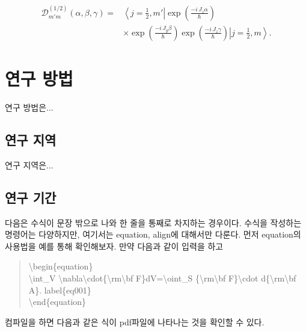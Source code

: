 \documentclass{gshs-report-v1.2}
\begin{document}
\begin{equation}
	\begin{split}
		\mathcal{D}_{m'm}^{(1/2)} (\alpha,\beta,\gamma)=&\left\langle j=\frac{1}{2},m'\right|\exp\left(\frac{-i\,J_z \alpha}{\hbar}\right)\\
		&\times\exp\left(\frac{-i\,J_y \beta}{\hbar}\right)\exp\left(\frac{-i\,J_z \gamma}{\hbar}\right)\left| j=\frac{1}{2},m\right\rangle.
	\end{split}
	\label{eq004}
\end{equation}


\section{연구 방법}
연구 방법은...

\subsection{연구 지역}
연구 지역은...

\subsection{연구 기간}

다음은 수식이 문장 밖으로 나와 한 줄을 통째로 차지하는 경우이다. 수식을 작성하는 명령어는 다양하지만, 여기서는 equation, align에 대해서만 다룬다. 먼저 equation의 사용법을 예를 통해 확인해보자. 만약 다음과 같이 입력을 하고
\begin{quote}
	{\textbackslash}begin\{equation\}\\
	{\textbackslash}int\_V 
	{\textbackslash}nabla{\textbackslash}cdot\{{\textbackslash}rm{\textbackslash}bf
	F\}dV={\textbackslash}oint\_S \{{\textbackslash}rm{\textbackslash}bf 
	F\}{\textbackslash}cdot d\{{\textbackslash}rm{\textbackslash}bf A\}. 
	\newline{\textbackslash}label\{eq001\} \\
	{\textbackslash}end\{equation\}
\end{quote}
컴파일을 하면 다음과 같은 식이 pdf파일에 나타나는 것을 확인할 수 있다.
\end{document}
